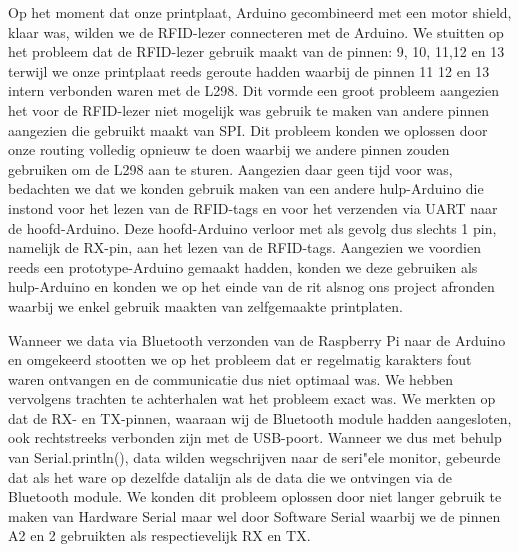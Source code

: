 Op het moment dat onze printplaat, Arduino gecombineerd met een motor shield, klaar was, wilden we de RFID-lezer connecteren met de Arduino. We stuitten op het probleem dat de RFID-lezer gebruik maakt van de pinnen: 9, 10, 11,12 en 13 terwijl we onze printplaat reeds geroute hadden waarbij de pinnen 11 12 en 13 intern verbonden waren met de L298. Dit vormde een groot probleem aangezien het voor de RFID-lezer niet mogelijk was gebruik te maken van andere pinnen aangezien die gebruikt maakt van SPI. Dit probleem konden we oplossen door onze routing volledig opnieuw te doen waarbij we andere pinnen zouden gebruiken om de L298 aan te sturen. Aangezien daar geen tijd voor was, bedachten we dat we konden gebruik maken van een andere hulp-Arduino die instond voor het lezen van de RFID-tags en voor het verzenden via UART naar de hoofd-Arduino. Deze hoofd-Arduino verloor met als gevolg dus slechts 1 pin, namelijk de RX-pin, aan het lezen van de RFID-tags. Aangezien we voordien reeds een prototype-Arduino gemaakt hadden, konden we deze gebruiken als hulp-Arduino en konden we op het einde van de rit alsnog ons project afronden waarbij we enkel gebruik maakten van zelfgemaakte printplaten.

Wanneer we data via Bluetooth verzonden van de Raspberry Pi naar de Arduino en omgekeerd stootten we op het probleem dat er regelmatig karakters fout waren ontvangen en de communicatie dus niet optimaal was. We hebben vervolgens trachten te achterhalen wat het probleem exact was. We merkten op dat de RX- en TX-pinnen, waaraan wij de Bluetooth module hadden aangesloten, ook rechtstreeks verbonden zijn met de USB-poort. Wanneer we dus met behulp van Serial.println(), data wilden wegschrijven naar de seri"ele monitor, gebeurde dat als het ware op dezelfde datalijn als de data die we ontvingen via de Bluetooth module. We konden dit probleem oplossen door niet langer gebruik te maken van Hardware Serial maar wel door Software Serial waarbij we de pinnen A2 en 2 gebruikten als respectievelijk RX en TX.

